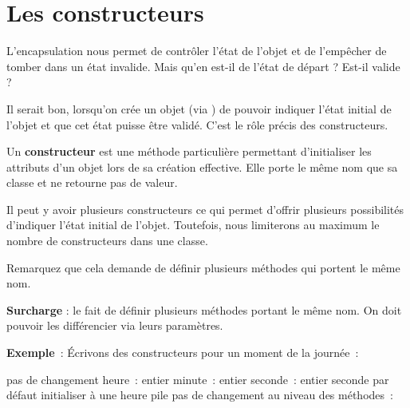 \section{Les constructeurs}

	L'encapsulation nous permet de contrôler
	l'état de l'objet et de
	l'empêcher de tomber dans un état invalide. Mais
	qu'en est-il de l'état de départ ?
	Est-il valide ?
	
	Il serait bon, lorsqu'on crée un objet (via
	) de pouvoir indiquer l'état
	initial de l'objet et que cet état puisse être validé.
	C'est le rôle précis des constructeurs.
	
	Un \textbf{constructeur} est une méthode particulière permettant
	d'initialiser les attributs d'un
	objet lors de sa création effective. Elle porte le même nom que sa
	classe et ne retourne pas de valeur.
	
	Il peut y avoir plusieurs constructeurs ce qui permet
	d'offrir plusieurs possibilités d'indiquer l'état initial de
	l'objet. Toutefois, nous limiterons au maximum le nombre 
	de constructeurs dans une classe.
	
	Remarquez que cela demande de définir plusieurs méthodes 
	qui portent le même nom.
	
	
	\textbf{Surcharge} : 
	le fait de définir plusieurs méthodes portant le même nom.
	On doit pouvoir les différencier via leurs paramètres.

	\textbf{Exemple}~:
	Écrivons des constructeurs pour un moment de la journée~:

	\begin{Pseudocode}
			\Private
				\LComment pas de changement
				\Decl heure~: entier
				\Decl minute~: entier
				\Decl seconde~: entier
			\Public
				 seconde par défaut
				\RComment initialiser à une heure pile
				\Empty
				\LComment pas de changement au niveau des méthodes~:
		\EndClass
		\end{Pseudocode}

